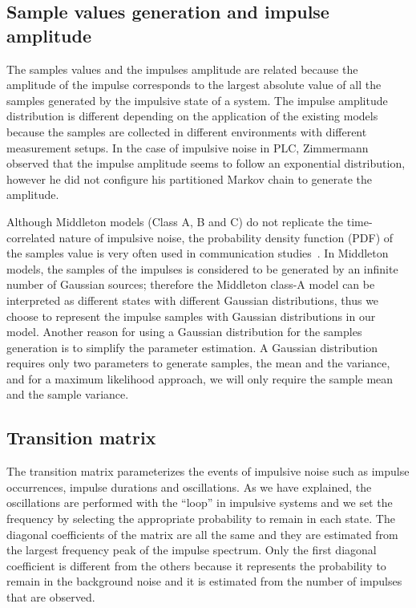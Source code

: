 \documentclass[journal]{IEEEtran}
\begin{document}
\subsection{Sample values generation and impulse amplitude}
The samples values and the impulses amplitude are related because the amplitude of the impulse corresponds to the largest absolute value of all the samples generated by the impulsive state of a system. The impulse amplitude distribution is different depending on the application of the existing models because the samples are collected in different environments with different measurement setups. In the case of impulsive noise in PLC, Zimmermann~\cite{zimmermann} observed that the impulse amplitude seems to follow an exponential distribution, however he did not configure his partitioned Markov chain to generate the amplitude.\

Although Middleton models (Class A, B and C) do not replicate the time-correlated nature of impulsive noise, the probability density function (PDF) of the samples value is very often used in communication studies~\cite{midd1,midd2,midd3}. In Middleton models, the samples of the impulses is considered to be generated by an infinite number of Gaussian sources; therefore the Middleton class-A model can be interpreted as different states with different Gaussian distributions, thus we choose to represent the impulse samples with Gaussian distributions in our model. Another reason for using a Gaussian distribution for the samples generation is to simplify the parameter estimation. A Gaussian distribution requires only two parameters to generate samples, the mean and the variance, and for a maximum likelihood approach, we will only require the sample mean and the sample variance.
\subsection{Transition matrix}
The transition matrix parameterizes the events of impulsive noise such as impulse occurrences, impulse durations and oscillations. As we have explained, the oscillations are performed with the ``loop'' in impulsive systems and we set the frequency by selecting the appropriate probability to remain in each state. The diagonal coefficients of the matrix are all the same and they are estimated from the largest frequency peak of the impulse spectrum. Only the first diagonal coefficient is different from the others because it represents the probability to remain in the background noise and it is estimated from the number of impulses that are observed.\
\end{document}
